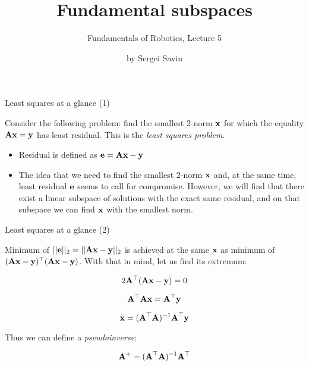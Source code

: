 \documentclass{beamer}
\title{Fundamental subspaces}
\subtitle{Fundamentals of Robotics, Lecture 5}
\author{by Sergei Savin}
\date{\mydate}
\begin{document}
\maketitle



\begin{frame}{Least squares at a glance (1)}
	\begin{flushleft}
		
		Consider the following problem: find the smallest 2-norm $\mathbf{x}$ for which the equality $\mathbf{A}\mathbf{x} = \mathbf{y}$ has least residual. This is the \emph{least squares problem}.
		
		\begin{itemize}
			\item Residual is defined as $\mathbf{e} = \mathbf{A}\mathbf{x} - \mathbf{y}$
			\item The idea that we need to find the smallest 2-norm $\mathbf{x}$ and, at the same time, least residual $\mathbf{e}$ seems to call for compromise. However, we will find that there exist a linear subspace of solutions with the exact same residual, and on that subspace we can find $\mathbf{x}$ with the smallest norm.
		\end{itemize}	
		
	\end{flushleft}
\end{frame}




\begin{frame}{Least squares at a glance (2)}
	\begin{flushleft}
		
		Minimum of $||\mathbf{e}||_2 = ||\mathbf{A}\mathbf{x} - \mathbf{y}||_2$ is achieved at the same $\mathbf{x}$ as minimum of $(\mathbf{A}\mathbf{x} - \mathbf{y})^\top(\mathbf{A}\mathbf{x} - \mathbf{y})$. With that in mind, let us find its extremum:
		
		\begin{equation}
			2\mathbf{A}^\top(\mathbf{A}\mathbf{x} - \mathbf{y}) = 0
		\end{equation}
		
		\begin{equation}
			\mathbf{A}^\top\mathbf{A}\mathbf{x} = \mathbf{A}^\top\mathbf{y}
		\end{equation}
		
		\begin{equation}
			\mathbf{x} = (\mathbf{A}^\top\mathbf{A})^{-1} \mathbf{A}^\top\mathbf{y}
		\end{equation}
		
		Thus we can define a \emph{pseudoinverse}:
		
		\begin{equation}
			\mathbf{A}^+ = (\mathbf{A}^\top\mathbf{A})^{-1} \mathbf{A}^\top
		\end{equation}
		
		
	\end{flushleft}
\end{frame}
\end{document}

